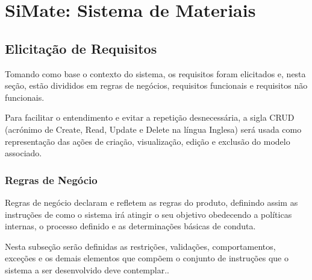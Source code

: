 
\chapter{SiMate: Sistema de Materiais}

\section{Elicitação de Requisitos}

Tomando como base o contexto do sistema, os requisitos foram elicitados e, nesta seção, estão divididos em regras de negócios, requisitos funcionais e requisitos não funcionais.

Para facilitar o entendimento e evitar a repetição desnecessária, a sigla CRUD (acrónimo de Create, Read, Update e Delete na língua Inglesa) será usada como representação das ações de criação, visualização, edição e exclusão do modelo associado.

\subsection{Regras de Negócio} \label{subsec:regras_de_negocio}

Regras de negócio declaram e refletem as regras do produto, definindo assim as instruções de como o sistema irá atingir o seu objetivo obedecendo a políticas internas, o processo definido e as determinações básicas de conduta. 

Nesta subseção serão definidas as restrições, validações, comportamentos, exceções e os demais elementos que compõem o conjunto de instruções que o sistema a ser desenvolvido deve contemplar..

